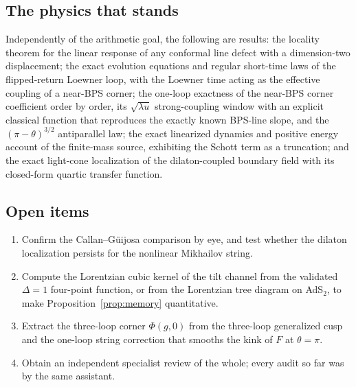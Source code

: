 \subsection{The physics that stands}

Independently of the arithmetic goal, the following are results: the locality theorem for the linear response of
any conformal line defect with a dimension-two displacement; the exact evolution equations and regular short-time laws
of the flipped-return Loewner loop, with the Loewner time acting as the effective coupling of a near-BPS corner; the
one-loop exactness of the near-BPS corner coefficient order by order, its $\sqrt{\lambda u}$ strong-coupling window
with an explicit classical function that reproduces the exactly known BPS-line slope, and the $(\pi-\theta)^{3/2}$
antiparallel law; the exact linearized dynamics and positive energy account of the finite-mass source, exhibiting the
Schott term as a truncation; and the exact light-cone localization of the dilaton-coupled boundary field with its
closed-form quartic transfer function.

\subsection{Open items}

\begin{enumerate}
\item Confirm the Callan--Güijosa comparison by eye, and test whether the dilaton localization persists for the
nonlinear Mikhailov string.
\item Compute the Lorentzian cubic kernel of the tilt channel from the validated $\Delta=1$ four-point function, or
from the Lorentzian tree diagram on AdS$_2$, to make Proposition~\ref{prop:memory} quantitative.
\item Extract the three-loop corner $\Phi(g,0)$ from the three-loop generalized cusp \cite{CHMSthree} and the one-loop
string correction that smooths the kink of $F$ at $\theta=\pi$.
\item Obtain an independent specialist review of the whole; every audit so far was by the same assistant.
\end{enumerate}
